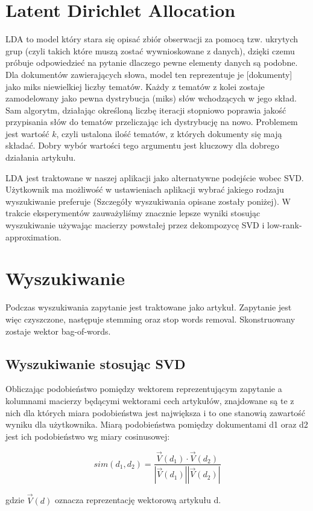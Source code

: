 \section{Latent Dirichlet Allocation}
LDA to model który stara się opisać zbiór obserwacji za pomocą tzw. ukrytych grup (czyli takich które muszą zostać wywnioskowane z danych), dzięki czemu próbuje odpowiedzieć na pytanie dlaczego pewne elementy danych są podobne. Dla dokumentów zawierających słowa, model ten reprezentuje je [dokumenty] jako miks niewielkiej liczby tematów. Każdy z tematów z kolei zostaje zamodelowany jako pewna dystrybucja (miks) słów wchodzących w jego skład. Sam algorytm, działając określoną liczbę iteracji stopniowo poprawia jakość przypisania słów do tematów przeliczając ich dystrybucję na nowo. Problemem jest wartość $k$, czyli ustalona ilość tematów, z których dokumenty się mają składać. Dobry wybór wartości tego argumentu jest kluczowy dla dobrego działania artykułu.

LDA jest traktowane w naszej aplikacji jako alternatywne podejście wobec SVD. Użytkownik ma możliwość w ustawieniach aplikacji wybrać jakiego rodzaju wyszukiwanie preferuje (Szczegóły wyszukiwania opisane zostały poniżej). W trakcie eksperymentów zauważyliśmy znacznie lepsze wyniki stosując wyszukiwanie używając macierzy powstałej przez dekompozycę SVD i low-rank-approximation.

\section{Wyszukiwanie}
Podczas wyszukiwania zapytanie jest traktowane jako artykuł. Zapytanie jest więc czyszczone, następuje stemming oraz stop words removal. Skonstruowany zostaje wektor bag-of-words. 

\subsection{Wyszukiwanie stosując SVD}
Obliczając podobieństwo pomiędzy wektorem reprezentującym zapytanie a kolumnami macierzy będącymi wektorami cech artykułów, znajdowane są te z nich dla których miara podobieństwa jest największa i to one stanowią zawartość wyniku dla użytkownika.
Miarą podobieństwa pomiędzy dokumentami d1 oraz d2 jest ich podobieństwo wg miary cosinusowej:

$$sim(d_1, d_2) = \frac{\vec{V} (d_1) \cdot \vec{V} (d_2)}{| \vec{V} (d_1) | | \vec{V} (d_2) | }$$

gdzie $\vec{V} (d)$ oznacza reprezentację wektorową artykułu d.\\

